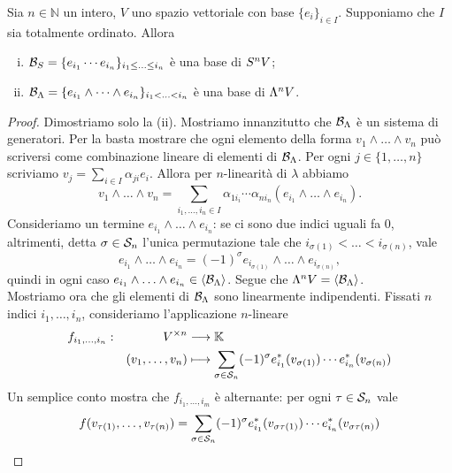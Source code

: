 \begin{proposition}
Sia $n\in\mathbb{N}$ un intero, $V$ uno spazio vettoriale con base $\{e_i\}_{i\in I}$. Supponiamo che $I$ sia totalmente ordinato. Allora
\begin{enumerate}[(i)]
\item $\mathcal{B}_S=\{e_{i_1}\cdots e_{i_n}\}_{i_1\le\ldots\le i_n}$ è una base di $S^nV$;
\item $\mathcal{B}_\Lambda=\{e_{i_1}\wedge\cdots\wedge e_{i_n}\}_{i_1<\ldots<i_n}$ è una base di $\Lambda^nV$.
\end{enumerate}
\end{proposition}
\begin{proof}
Dimostriamo solo la (ii). Mostriamo innanzitutto che $\mathcal{B}_\Lambda$ è un sistema di generatori. Per la  basta mostrare che ogni elemento della forma $v_1\wedge\ldots\wedge v_n$ può scriversi come combinazione lineare di elementi di $\mathcal{B}_\Lambda$. Per ogni $j\in\{1,\ldots,n\}$ scriviamo $v_j=\sum_{i\in I}\alpha_{ji}e_i$. Allora per $n$-linearità di $\lambda$ abbiamo
$$
v_1\wedge\ldots\wedge v_n=\sum_{i_1,\ldots,i_n\in I}\alpha_{1i_i}\cdots\alpha_{ni_n}(e_{i_1}\wedge\ldots\wedge e_{i_n}).
$$
Consideriamo un termine $e_{i_1}\wedge\ldots\wedge e_{i_n}$: se ci sono due indici uguali fa 0, altrimenti, detta $\sigma\in\mathcal{S}_n$ l'unica permutazione tale che $i_{\sigma(1)}<\ldots<i_{\sigma(n)}$, vale 
$$
e_{i_1}\wedge\ldots\wedge e_{i_n}=(-1)^\sigma e_{i_{\sigma(1)}}\wedge\ldots\wedge e_{i_{\sigma(n)}},
$$
quindi in ogni caso $e_{i_1}\wedge\ldots\wedge e_{i_n}\in\langle\mathcal{B}_\Lambda\rangle$. Segue che $\Lambda^nV=\langle\mathcal{B}_\Lambda\rangle$.\\
Mostriamo ora che gli elementi di $\mathcal{B}_\Lambda$ sono linearmente indipendenti. Fissati $n$ indici $i_1,\ldots,i_n$, consideriamo l'applicazione $n$-lineare
\begin{alignat*}{2}
f_{i_1,\ldots,i_n}:&&V^{\times n}&\longrightarrow\mathbb{K}\\
&&(v_1,\ldots,v_n)&\longmapsto\sum_{\sigma\in\mathcal{S}_n}(-1)^\sigma e_{i_1}^*(v_{\sigma(1)})\cdots e_{i_n}^*(v_{\sigma(n)})
\end{alignat*}
Un semplice conto mostra che $f_{i_1,\ldots,i_m}$ è alternante: per ogni $\tau\in\mathcal{S}_n$ vale
\begin{align*}
f(v_{\tau(1)},\ldots,v_{\tau(n)})&=\sum_{\sigma\in\Sym_n}(-1)^\sigma e_{i_1}^*(v_{\sigma\tau(1)})\cdots e_{i_n}^*(v_{\sigma\tau(n)})\\

\end{align*}
\end{proof}
